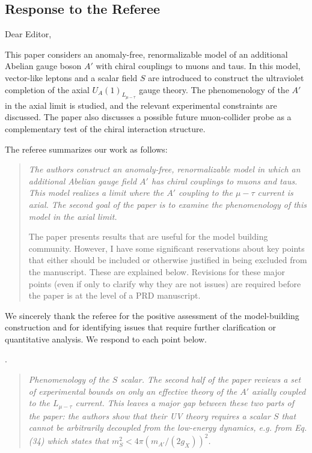 \documentclass[12pt,a4paper]{article}
\begin{document}
\subsection*{Response to the Referee}

\noindent Dear Editor,

This paper considers an anomaly-free, renormalizable model of an additional Abelian
gauge boson \(A'\) with chiral couplings to muons and taus. In this model, vector-like
leptons and a scalar field \(S\) are introduced to construct the ultraviolet completion
of the axial \(U_A(1)_{L_{\mu-\tau}}\) gauge theory. The phenomenology of the \(A'\) in
the axial limit is studied, and the relevant experimental constraints are discussed.
The paper also discusses a possible future muon-collider probe as a complementary test of the chiral interaction structure.

The referee summarizes our work as follows:

\begin{quote}
\itshape
The authors construct an anomaly-free, renormalizable model in which an additional Abelian gauge field \(A'\) has chiral couplings to muons and taus. This model realizes a limit where the \(A'\) coupling to the \(\mu-\tau\) current is axial. The second goal of the paper is to examine the phenomenology of this model in the axial limit.

The paper presents results that are useful for the model building community. However, I have some significant reservations about key points that either should be included or otherwise justified in being excluded from the manuscript. These are explained below. Revisions for these major points (even if only to clarify why they are not issues) are required before the paper is at the level of a PRD manuscript.
\end{quote}

We sincerely thank the referee for the positive assessment of the model-building construction and for identifying issues that require further clarification or quantitative analysis. We respond to each point below.

\medskip
{}. \begin{quote}\itshape
Phenomenology of the \(S\) scalar. The second half of the paper reviews a set of experimental bounds on only an effective theory of the \(A'\) axially coupled to the \(L_{\mu-\tau}\) current. This leaves a major gap between these two parts of the paper: the authors show that their UV theory requires a scalar \(S\) that cannot be arbitrarily decoupled from the low-energy dynamics, e.g. from Eq. (34) which states that \(m_S^2 < 4\pi\left(m_{A'}/(2g_X)\right)^2\).\end{quote}
\end{document}
